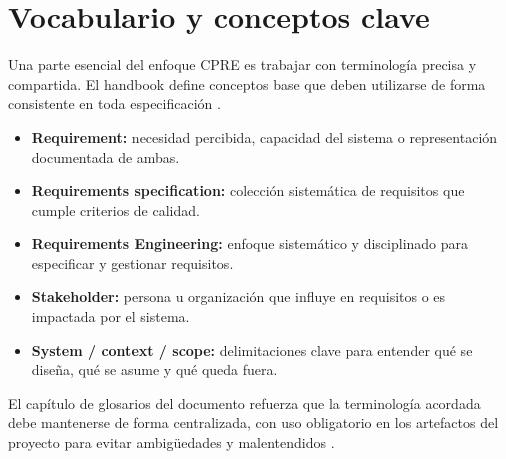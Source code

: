 \section{Vocabulario y conceptos clave}
Una parte esencial del enfoque CPRE es trabajar con terminolog\'ia precisa y compartida. El handbook define conceptos base que deben utilizarse de forma consistente en toda especificaci\'on \cite[pp.~10--11]{cpre}.

\begin{itemize}[leftmargin=1.2em]
  \item \textbf{Requirement:} necesidad percibida, capacidad del sistema o representaci\'on documentada de ambas.
  \item \textbf{Requirements specification:} colecci\'on sistem\'atica de requisitos que cumple criterios de calidad.
  \item \textbf{Requirements Engineering:} enfoque sistem\'atico y disciplinado para especificar y gestionar requisitos.
  \item \textbf{Stakeholder:} persona u organizaci\'on que influye en requisitos o es impactada por el sistema.
  \item \textbf{System / context / scope:} delimitaciones clave para entender qu\'e se dise\~na, qu\'e se asume y qu\'e queda fuera.
\end{itemize}

El cap\'itulo de glosarios del documento refuerza que la terminolog\'ia acordada debe mantenerse de forma centralizada, con uso obligatorio en los artefactos del proyecto para evitar ambig\"uedades y malentendidos \cite[pp.~72--73]{cpre}.
